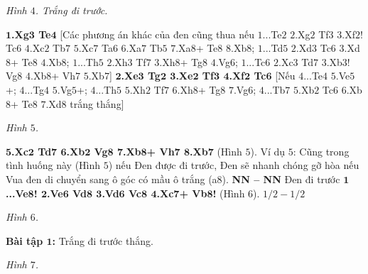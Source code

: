 \begin{multicols}{2}
\begin{center}
		\newgame
		\scalebox{0.85}\showboard
		\vskip 0.1cm
		\textit{\small\color{gocco}Hình $4$. Trắng đi trước.}
	\end{center}
	\textbf{\color{gocco}$\pmb{1}$.Xg$\pmb{3}$ Te$\pmb{4}$} [Các phương án khác của đen cũng thua nếu $1$...Te$2$ $2$.Xg$2$ Tf$3$ $3$.Xf$2$! Tc$6$ $4$.Xc$2$ Tb$7$ $5$.Xc$7$ Ta$6$ $6$.Xa$7$ Tb$5$ $7$.Xa$8$+ Te$8$ $8$.Xb$8$; $1$...Td$5$ $2$.Xd$3$ Tc$6$ $3$.Xd$8$+ Te$8$ $4$.Xb$8$; $1$...Th$5$ $2$.Xh$3$ Tf$7$ $3$.Xh$8$+ Tg$8$ $4$.Vg$6$; $1$...Tc$6$ $2$.Xc$3$ Td$7$ $3$.Xb$3$! Vg$8$ $4$.Xb$8$+ Vh$7$ $5$.Xb$7$]
	\vskip 0.1cm
	\textbf{\color{gocco}$\pmb{2}$.Xe$\pmb{3}$ Tg$\pmb{2}$ $\pmb{3}$.Xe$\pmb{2}$ Tf$\pmb{3}$ $\pmb{4}$.Xf$\pmb{2}$ Tc$\pmb{6}$} [Nếu $4$...Te$4$ $5$.Ve$5$+; $4$...Tg$4$ $5$.Vg$5$+; $4$...Th$5$ $5$.Xh$2$ Tf$7$ $6$.Xh$8$+ Tg$8$ $7$.Vg$6$; $4$...Tb$7$ $5$.Xb$2$ Tc$6$ $6$.Xb$8$+ Te$8$ $7$.Xd$8$ trắng thắng]
	\begin{center}
		\newgame
		\scalebox{0.85}\showboard
		\vskip 0.1cm
		\textit{\small\color{gocco}Hình $5$.}
	\end{center}
	\textbf{\color{gocco}$\pmb{5}$.Xc$\pmb{2}$ Td$\pmb{7}$ $\pmb{6}$.Xb$\pmb{2}$ Vg$\pmb{8}$ $\pmb{7}$.Xb$\pmb{8}$+ Vh$\pmb{7}$ $\pmb{8}$.Xb$\pmb{7}$} (Hình $5$).
	\vskip 0.1cm
	Ví dụ $5$:
	\vskip 0.1cm
	Cũng trong tình huống này (Hình $5$) nếu Đen được đi trước, Đen sẽ nhanh chóng gỡ hòa nếu Vua đen di chuyển  sang ô góc có mầu ô trắng (a$8$).
	\vskip 0.1cm
	\textbf{\color{gocco}NN -- NN}
	\vskip 0.1cm
	Đen đi trước
	\vskip 0.1cm
	\textbf{\color{gocco}$\pmb{1}$...Ve$\pmb{8}$! $\pmb{2}$.Ve$\pmb{6}$ Vd$\pmb{8}$ $\pmb{3}$.Vd$\pmb{6}$ Vc$\pmb{8}$ $\pmb{4}$.Xc$\pmb{7}$+ Vb$\pmb{8}$!} (Hình $6$).
	\vskip 0.1cm
	$1/2 - 1/2$
	\begin{center}
		\newgame
		\scalebox{0.85}\showboard
		\vskip 0.1cm
		\textit{\small\color{gocco}Hình $6$.}
	\end{center}
	\textbf{\color{gocco}Bài tập $\pmb{1}$:} Trắng đi trước thắng.
	\begin{center}
		\newgame
		\scalebox{0.85}\showboard
		\vskip 0.1cm
		\textit{\small\color{gocco}Hình $7$.}
	\end{center}
\end{multicols}




